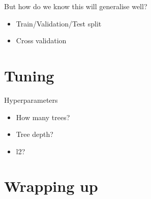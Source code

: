 \documentclass[obeyspaces,aspectratio=43]{beamer}
\providecommand{\tightlist}{%
  \setlength{\itemsep}{0pt}\setlength{\parskip}{0pt}}
\begin{document}
\begin{frame}{But how do we know this will generalise well?}

\begin{itemize}
\tightlist
\item
  Train/Validation/Test split
\item
  Cross validation
\end{itemize}

\end{frame}

\section{Tuning}\label{tuning}

\begin{frame}{Hyperparameters}

\begin{itemize}
\tightlist
\item
  How many trees?
\item
  Tree depth?
\item
  l2?
\end{itemize}

\end{frame}

\section{Wrapping up}\label{wrapping-up}
\end{document}

